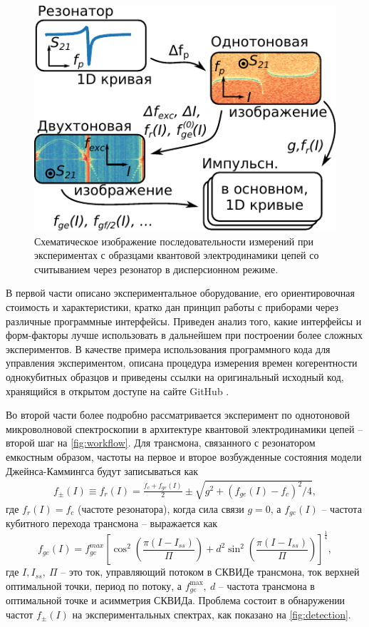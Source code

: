 \documentclass[14pt, a4paper]{extarticle}
\begin{document}
\begin{figure}
	\centering
	\includegraphics[width=0.5\linewidth]{Pictures/workflow}
	\caption{Схематическое изображение последовательности измерений при экспериментах с образцами квантовой электродинамики цепей со считыванием через резонатор в дисперсионном режиме.}
	\label{fig:workflow}
\end{figure}

В первой части описано экспериментальное оборудование, его ориентировочная стоимость и характеристики, кратко дан принцип работы с приборами через различные программные интерфейсы. Приведен анализ того, какие интерфейсы и форм-факторы лучше использовать в дальнейшем при построении более сложных экспериментов. В качестве примера использования программного кода для управления экспериментом, описана процедура измерения времен когерентности однокубитных образцов и приведены ссылки на оригинальный исходный код, хранящийся в открытом доступе на сайте GitHub \cite{fedorov2021github}.


Во второй части более подробно рассматривается эксперимент по однотоновой микроволновой спектроскопии в архитектуре квантовой электродинамики цепей -- второй шаг на \autoref{fig:workflow}. Для трансмона, связанного с резонатором емкостным образом, частоты на первое и второе возбужденные состояния модели Джейнса-Каммингса будут записываться как 
\begin{align}
f_\pm(I) \equiv f_r(I) = \frac{f_c + f_{ge}(I)}{2} \pm \sqrt{g^2+(f_{ge}(I) - f_c)^2/4},\label{eq:f_r}
\end{align}
где $f_r(I) = f_c$ (частоте резонатора), когда сила связи $g=0$, а $f_{ge}(I)$ -- частота кубитного перехода трансмона -- выражается как
\begin{equation}
f_{ge}(I) = f_{ge}^{max} \left[\cos^2\left(\frac{\pi(I-I_{ss})}{\Pi}\right)+d^2 \sin^2 \left(\frac{\pi(I-I_{ss})}{\Pi}\right)\right]^\frac{1}{4},
\label{eq:tr_spectrum}
\end{equation}
где $I, I_{ss},\ \Pi$ -- это ток, управляющий потоком в СКВИДе трансмона, ток верхней оптимальной точки, период по потоку, а $f_{ge}^\text{max},\ d$ -- частота трансмона в оптимальной точке и асимметрия СКВИДа. Проблема состоит в обнаружении частот $f_{\pm}(I)$ на экспериментальных спектрах, как показано на \autoref{fig:detection}.
	
\end{document}
